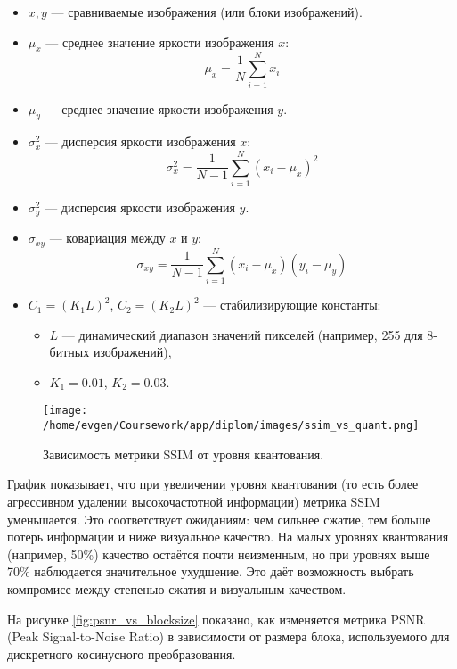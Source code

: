 \begin{itemize}
    \item $x, y$ — сравниваемые изображения (или блоки изображений).
    \item $\mu_x$ — среднее значение яркости изображения $x$:
    \[
        \mu_x = \frac{1}{N} \sum_{i=1}^{N} x_i
    \]
    \item $\mu_y$ — среднее значение яркости изображения $y$.
    
    \item $\sigma_x^2$ — дисперсия яркости изображения $x$:
    \[
        \sigma_x^2 = \frac{1}{N-1} \sum_{i=1}^{N} (x_i - \mu_x)^2
    \]
    \item $\sigma_y^2$ — дисперсия яркости изображения $y$.
    
    \item $\sigma_{xy}$ — ковариация между $x$ и $y$:
    \[
        \sigma_{xy} = \frac{1}{N-1} \sum_{i=1}^{N} (x_i - \mu_x)(y_i - \mu_y)
    \]
    
    \item $C_1 = (K_1 L)^2$, $C_2 = (K_2 L)^2$ — стабилизирующие константы:
    \begin{itemize}
        \item $L$ — динамический диапазон значений пикселей (например, 255 для 8-битных изображений),
        \item $K_1 = 0.01$, $K_2 = 0.03$.
    \end{itemize}
\end{itemize}



\begin{figure}[H]
    \centering
    \texttt{[image: /home/evgen/Coursework/app/diplom/images/ssim\_vs\_quant.png]}
    \caption{Зависимость метрики SSIM от уровня квантования.}
    \label{fig:ssim_vs_quant}
\end{figure}

График показывает, что при увеличении уровня квантования 
(то есть более агрессивном удалении высокочастотной информации) метрика SSIM уменьшается. 
Это соответствует ожиданиям: чем сильнее сжатие, тем больше потерь информации и ниже визуальное качество. 
На малых уровнях квантования (например, 50\%) качество остаётся почти неизменным, но при уровнях выше 70\% наблюдается значительное ухудшение. 
Это даёт возможность выбрать компромисс между степенью сжатия и визуальным качеством.


\clearpage
На рисунке \ref{fig:psnr_vs_blocksize} показано, как изменяется метрика PSNR (Peak Signal-to-Noise Ratio) в зависимости от размера блока, 
используемого для дискретного косинусного преобразования.

